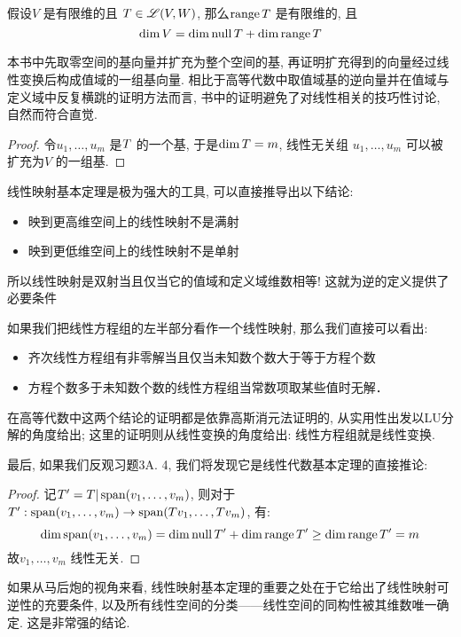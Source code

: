 \begin{theorem}
    假设\(V\) 是有限维的且 \(T \in \mathscr{L}(V,W)\), 那么\(\operatorname{range}
    T\) 是有限维的, 且\[
        \dim V = \dim \operatorname{null} T + \dim \operatorname{range} T
    \]
\end{theorem}
本书中先取零空间的基向量并扩充为整个空间的基, 再证明扩充得到的向量经过线性变换后构成值域的一组基向量.
相比于高等代数中取值域基的逆向量并在值域与定义域中反复横跳的证明方法而言,
书中的证明避免了对线性相关的技巧性讨论, 自然而符合直觉.

\begin{proof}
    令\(u_1, \dots , u_{m}\) 是\(\null T\) 的一个基, 于是\(\dim
    \null T = m\), 线性无关组 \(u_{1}, \dots ,u_{m}\) 可以被扩充为\(V\) 的一组基.
\end{proof}

线性映射基本定理是极为强大的工具, 可以直接推导出以下结论:

\begin{itemize}
    \item 映到更高维空间上的线性映射不是满射
    \item 映到更低维空间上的线性映射不是单射
\end{itemize}
所以线性映射是双射当且仅当它的值域和定义域维数相等! 这就为逆的定义提供了必要条件

如果我们把线性方程组的左半部分看作一个线性映射, 那么我们直接可以看出:
\begin{itemize}
    \item 齐次线性方程组有非零解当且仅当未知数个数大于等于方程个数
    \item 方程个数多于未知数个数的线性方程组当常数项取某些值时无解．
\end{itemize}

在高等代数中这两个结论的证明都是依靠高斯消元法证明的, 从实用性出发以LU分解的角度给出;
这里的证明则从线性变换的角度给出: 线性方程组就是线性变换.

最后, 如果我们反观习题3A. 4, 我们将发现它是线性代数基本定理的直接推论:
\begin{proof}
    记\(T'= T|\operatorname{span}(v_{1}, \dots, v_{m})\),
    则对于\(T': \operatorname{span}(v_{1}, \dots, v_{m}) \to
    \operatorname{span}(Tv_{1}, \dots, Tv_{m})\), 有:
    \[
        \dim \operatorname{span}(v_{1}, \dots, v_{m}) = \dim
        \operatorname{null} T' +
        \dim \operatorname{range} T' \geq \dim \operatorname{range} T' = m
    \]
    故\(v_{1}, \dots, v_{m}\) 线性无关.
\end{proof}

如果从马后炮的视角来看,
线性映射基本定理的重要之处在于它给出了线性映射可逆性的充要条件,
以及所有线性空间的分类——线性空间的同构性被其维数唯一确定. 这是非常强的结论.

